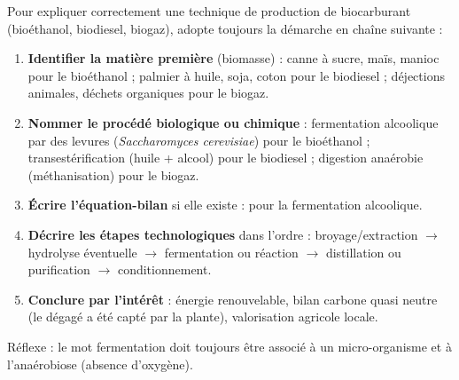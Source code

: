 \documentclass[11pt]{article}
\newcommand{\cle}[1]{{\popxbold\color{popdark}#1}}
\begin{document}
\begin{methode}
Pour expliquer correctement une technique de production de biocarburant (bioéthanol, biodiesel, biogaz), adopte toujours la démarche en chaîne suivante :
\begin{enumerate}
\item \textbf{Identifier la matière première} (biomasse) : canne à sucre, maïs, manioc pour le bioéthanol ; palmier à huile, soja, coton pour le biodiesel ; déjections animales, déchets organiques pour le biogaz.
\item \textbf{Nommer le procédé biologique ou chimique} : fermentation alcoolique par des levures (\emph{Saccharomyces cerevisiae}) pour le bioéthanol ; transestérification (huile + alcool) pour le biodiesel ; digestion anaérobie (méthanisation) pour le biogaz.
\item \textbf{Écrire l'équation-bilan} si elle existe :  pour la fermentation alcoolique.
\item \textbf{Décrire les étapes technologiques} dans l'ordre : broyage/extraction $\rightarrow$ hydrolyse éventuelle $\rightarrow$ fermentation ou réaction $\rightarrow$ distillation ou purification $\rightarrow$ conditionnement.
\item \textbf{Conclure par l'intérêt} : énergie renouvelable, bilan carbone quasi neutre (le  dégagé a été capté par la plante), valorisation agricole locale.
\end{enumerate}
Réflexe : le mot \cle{fermentation} doit toujours être associé à un micro-organisme et à l'\cle{anaérobiose} (absence d'oxygène).
\end{methode}
\end{document}
